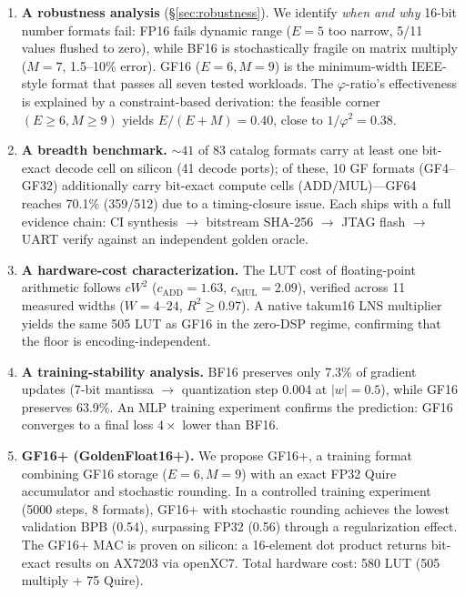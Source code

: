 \documentclass[11pt]{article}
\begin{document}
\begin{enumerate}[label=\arabic*.,leftmargin=*]
\item \textbf{A robustness analysis} (\S\ref{sec:robustness}). We identify
  \emph{when and why} 16-bit number formats fail: FP16 fails dynamic range
  ($E{=}5$ too narrow, 5/11 values flushed to zero), while BF16 is
  stochastically fragile on matrix multiply ($M{=}7$, 1.5--10\% error).
  GF16 ($E{=}6, M{=}9$) is the minimum-width IEEE-style format that
  passes all seven tested workloads. The $\varphi$-ratio's effectiveness
  is explained by a constraint-based derivation: the feasible corner
  $(E{\geq}6, M{\geq}9)$ yields $E/(E{+}M){=}0.40$, close to
  $1/\varphi^2{=}0.38$.

\item \textbf{A breadth benchmark.} ${\sim}41$ of 83 catalog formats carry
  at least one bit-exact decode cell on silicon (41 decode ports); of these,
  10 GF formats (GF4--GF32) additionally carry bit-exact compute cells
  (ADD/MUL)---GF64 reaches 70.1\% (359/512) due to a timing-closure issue.
  Each ships with a full evidence chain: CI synthesis $\to$ bitstream
  SHA-256 $\to$ JTAG flash $\to$ UART verify against an independent
  golden oracle.

\item \textbf{A hardware-cost characterization.} The LUT cost of
  floating-point arithmetic follows $cW^2$ ($c_{\text{ADD}}{=}1.63$,
  $c_{\text{MUL}}{=}2.09$), verified across 11 measured widths
  ($W{=}4$--$24$, $R^2{\geq}0.97$). A native takum16 LNS multiplier
  yields the same 505 LUT as GF16 in the zero-DSP regime, confirming
  that the floor is encoding-independent.

\item \textbf{A training-stability analysis.} BF16 preserves only 7.3\%
   of gradient updates (7-bit mantissa $\to$ quantization step 0.004 at
   $|w|{=}0.5$), while GF16 preserves 63.9\%. An MLP training experiment
   confirms the prediction: GF16 converges to a final loss $4\times$
   lower than BF16.

\item \textbf{GF16+ (GoldenFloat16+).} We propose GF16+, a training
  format combining GF16 storage ($E{=}6, M{=}9$) with an exact FP32
  Quire accumulator and stochastic rounding. In a controlled training
  experiment (5000 steps, 8 formats), GF16+ with stochastic rounding
  achieves the lowest validation BPB (0.54), surpassing FP32 (0.56)
  through a regularization effect. The GF16+ MAC is proven on silicon:
  a 16-element dot product returns bit-exact results on AX7203 via
  openXC7. Total hardware cost: 580 LUT (505 multiply + 75 Quire).
\end{enumerate}
\end{document}
